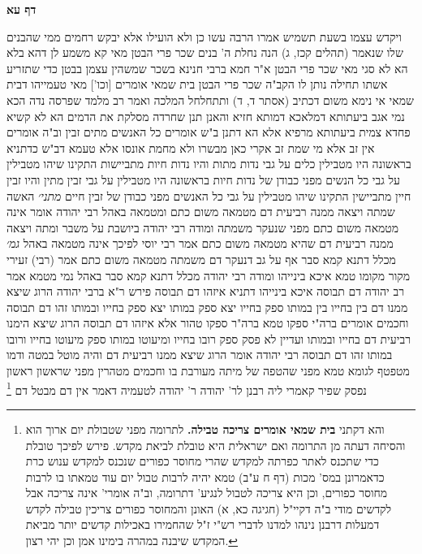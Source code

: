 \documentclass[12pt, openany]{book}
\newcommand{\sethebfont}{
\fontsize{10.5pt}{21.0pt} \selectfont
}
\newcommand{\twocol}[1]{
	{\sethebfont \begin{multicols}{2}
			#1
	\end{multicols}}	
}
\newcommand{\sectname}{}
\newcommand{\newsection}[1]{
	\addcontentsline{toc}{section}{#1}
	\renewcommand{\sectname}{#1}	
	\vspace{-\baselineskip}
	\begin{center}
		\textbf{%
\fontsize{16pt}{16pt}\selectfont
			#1}
	\end{center}
	\vspace{-\baselineskip}
	\nopagebreak
}
\newcommand{\footnotecomment}[1]{\footnote{#1}}
\newcommand{\commenta}[1]{\footnotecomment{#1}}
\begin{document}
\newsection{דף עא}
\twocol{ויקדש עצמו בשעת תשמיש 
אמרו  הרבה עשו כן ולא הועילו  אלא  יבקש רחמים ממי שהבנים שלו שנאמר  (תהלים קכז, ג) הנה נחלת ה' בנים שכר פרי הבטן 
מאי קא משמע לן דהא בלא הא לא סגי 
מאי שכר פרי הבטן  א"ר חמא ברבי חנינא  בשכר שמשהין עצמן בבטן כדי שתזריע אשתו תחילה נותן לו הקב"ה שכר פרי הבטן
בית שמאי אומרים [וכו'] מאי טעמייהו דבית שמאי  אי נימא משום דכתיב (אסתר ד, ד) ותתחלחל המלכה ואמר רב  מלמד שפרסה נדה הכא נמי אגב ביעתותא דמלאכא דמותא חזיא  והאנן תנן  שחרדה מסלקת את הדמים  הא לא קשיא פחדא צמית ביעתותא מרפיא 
אלא הא דתנן ב"ש אומרים  כל האנשים מתים זבין וב"ה אומרים  אין זב אלא מי שמת זב 
אקרי כאן מבשרו ולא מחמת אונסו 
אלא טעמא דב"ש כדתניא  בראשונה היו מטבילין כלים על גבי נדות מתות והיו נדות חיות מתביישות  התקינו שיהו מטבילין על גבי כל הנשים מפני כבודן של נדות חיות 
בראשונה היו מטבילין על גבי זבין מתין והיו זבין חיין מתביישין  התקינו שיהו מטבילין על גבי כל האנשים מפני כבודן של זבין חיים
{\large\emph{מתני׳}} האשה שמתה ויצאה ממנה רביעית דם מטמאה משום כתם ומטמאה באהל
רבי יהודה אומר  אינה מטמאה משום כתם מפני שנעקר משמתה  ומודה רבי יהודה ביושבת על משבר ומתה ויצאה ממנה רביעית דם שהיא מטמאה משום כתם  אמר רבי יוסי  לפיכך אינה מטמאה באהל
{\large\emph{גמ׳}} מכלל דתנא קמא סבר אף על גב דנעקר דם משמתה מטמאה משום כתם 
אמר (רבי) זעירי מקור מקומו טמא איכא בינייהו
ומודה רבי יהודה
מכלל דתנא קמא  סבר באהל נמי מטמא  אמר רב יהודה  דם תבוסה איכא בינייהו 
דתניא איזהו דם תבוסה  פירש ר"א ברבי יהודה  הרוג שיצא ממנו דם בין בחייו בין במותו ספק בחייו יצא ספק במותו יצא ספק בחייו ובמותו זהו דם תבוסה 
וחכמים אומרים  ברה"י ספקו טמא ברה"ר ספקו טהור 
אלא איזהו דם תבוסה הרוג שיצא הימנו רביעית דם בחייו ובמותו ועדיין לא פסק ספק רובו בחייו ומיעוטו במותו ספק מיעוטו בחייו ורובו במותו זהו דם תבוסה 
רבי יהודה אומר  הרוג שיצא ממנו רביעית דם והיה מוטל במטה ודמו מטפטף לגומא טמא מפני שהטפה של מיתה מעורבת בו  וחכמים מטהרין מפני
שראשון ראשון נפסק  שפיר קאמרי ליה רבנן לר' יהודה  ר' יהודה לטעמיה דאמר אין דם מבטל דם 
\commenta{והא דקתני \textbf{בית שמאי אומרים צריכה טבילה.}  לתרומה מפני שטבולת יום ארוך הוא והסיחה דעתה מן התרומה ואם ישראלית היא טובלת לביאת מקדש. פירש לפיכך טובלת כדי שתכנס לאתר כפרתה למקדש שהרי מחוסר כפורים שנכנס למקדש ענוש כרת כדאמרונן במס' מכות (דף ח ע"ב) טמא יהיה לרבות טבול יום עוד טמאתו בו לרבות מחוסר כפורים, וכן היא צריכה לטבול לנגיע' דתרומה, וב"ה אומרי' אינה צריכה אבל לקדשים מודי ב"ה דקיי"ל (חגיגה כא, א) האונן והמחוסר כפורים צריכין טבילה לקדש דמעלות דרבנן נינהו למדנו לדברי רש"י ז"ל שהחמירו באכילות קדשים יותר מביאת המקדש שיבנה במהרה בימינו אמן וכן יהי רצון. }

}
\end{document}

